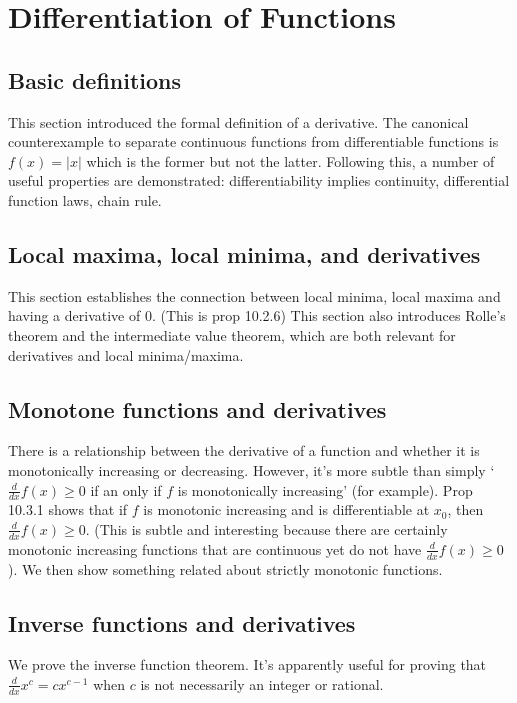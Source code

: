 \documentclass[answers,12pt]{exam}
\begin{document}
\section{}

\section{Differentiation of Functions}
\subsection{Basic definitions}
This section introduced the formal definition of a derivative.
The canonical counterexample to separate continuous functions from differentiable functions is $f(x) = |x|$ which is the former but not the latter.
Following this, a number of useful properties are demonstrated: differentiability implies continuity, differential function laws, chain rule.

\subsection{Local maxima, local minima, and derivatives}
This section establishes the connection between local minima, local maxima and having a derivative of 0.
(This is prop 10.2.6)
This section also introduces Rolle's theorem and the intermediate value theorem, which are both relevant for derivatives and local minima/maxima.

\subsection{Monotone functions and derivatives}
There is a relationship between the derivative of a function and whether it is monotonically increasing or decreasing.
However, it's more subtle than simply `$\frac{d}{dx}f(x)\geq 0$ if an only if $f$ is monotonically increasing' (for example).
Prop 10.3.1 shows that if $f$ is monotonic increasing and is differentiable at $x_0$, then $\frac{d}{dx}f(x) \geq 0$.
(This is subtle and interesting because there are certainly monotonic increasing functions that are continuous yet do not have $\frac{d}{dx}f(x) \geq 0$).
We then show something related about strictly monotonic functions.

\subsection{Inverse functions and derivatives}
We prove the inverse function theorem.
It's apparently useful for proving that $\frac{d}{dx} x^c = cx^{c-1}$ when $c$ is not necessarily an integer or rational.
\end{document}
